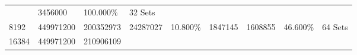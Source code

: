 \documentclass[11pt]{article}
\begin{document}
\begin{longtable}[]{@{}lllllllll@{}}
\begin{minipage}[t]{0.08\columnwidth}
\end{minipage} & \begin{minipage}[t]{0.09\columnwidth}\raggedright\strut
3456000\strut
\end{minipage} & \begin{minipage}[t]{0.09\columnwidth}\raggedright\strut
100.000\%\strut
\end{minipage} & \begin{minipage}[t]{0.06\columnwidth}\raggedright\strut
32 Sets\strut
\end{minipage}\tabularnewline
\begin{minipage}[t]{0.12\columnwidth}\raggedright\strut
8192\strut
\end{minipage} & \begin{minipage}[t]{0.09\columnwidth}\raggedright\strut
449971200\strut
\end{minipage} & \begin{minipage}[t]{0.07\columnwidth}\raggedright\strut
200352973\strut
\end{minipage} & \begin{minipage}[t]{0.08\columnwidth}\raggedright\strut
24287027\strut
\end{minipage} & \begin{minipage}[t]{0.08\columnwidth}\raggedright\strut
10.800\%\strut
\end{minipage} & \begin{minipage}[t]{0.08\columnwidth}\raggedright\strut
1847145\strut
\end{minipage} & \begin{minipage}[t]{0.09\columnwidth}\raggedright\strut
1608855\strut
\end{minipage} & \begin{minipage}[t]{0.09\columnwidth}\raggedright\strut
46.600\%\strut
\end{minipage} & \begin{minipage}[t]{0.06\columnwidth}\raggedright\strut
64 Sets\strut
\end{minipage}\tabularnewline
\begin{minipage}[t]{0.12\columnwidth}\raggedright\strut
16384\strut
\end{minipage} & \begin{minipage}[t]{0.09\columnwidth}\raggedright\strut
449971200\strut
\end{minipage} & \begin{minipage}[t]{0.07\columnwidth}\raggedright\strut
210906109\strut
\end{minipage} & \begin{minipage}[t]{0.08\columnwidth}\raggedright\strut

\end{minipage}
\end{longtable}
\end{document}
